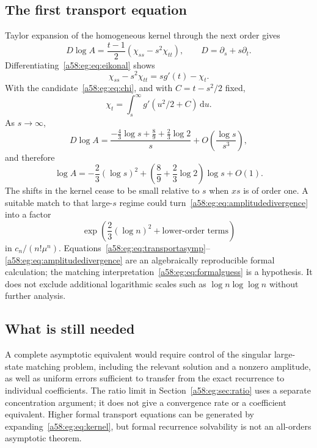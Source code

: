 \documentclass[11pt,letterpaper]{article}
\theoremstyle{remark}
\newcommand{\egdd}{\,\mathrm d}
\newcommand{\muval}{\mu}
\begin{document}
\subsection{The first transport equation}
Taylor expansion of the homogeneous kernel through the next order gives
\begin{equation}\label{a58:eg:eq:transport}
 D\log A=\frac{t-1}{2}(\chi_{ss}-s^2\chi_{tt}),
 \qquad D=\partial_s+s\partial_t.
\end{equation}
Differentiating~\eqref{a58:eg:eq:eikonal} shows
\[
 \chi_{ss}-s^2\chi_{tt}=s g'(t)-\chi_t.
\]
With the candidate~\eqref{a58:eg:eq:chi}, and with $C=t-s^2/2$ fixed,
\[
 \chi_t=\int_s^\infty g'(u^2/2+C)\egdd u.
\]
As $s\to\infty$,
\begin{equation}\label{a58:eg:eq:transportasymp}
 D\log A=
 \frac{-\frac43\log s+\frac89+\frac23\log2}{s}
 +O\left(\frac{\log s}{s^3}\right),
\end{equation}
and therefore
\begin{equation}\label{a58:eg:eq:amplitudedivergence}
 \log A=-\frac23(\log s)^2
 +\left(\frac89+\frac23\log2\right)\log s+O(1).
\end{equation}
The shifts in the kernel cease to be small relative to $s$ when $xs$ is of order one. A suitable match to that large-$s$ regime could turn~\eqref{a58:eg:eq:amplitudedivergence} into a factor
\begin{equation}\label{a58:eg:eq:formalguess}
 \exp\left(\frac23(\log n)^2+\text{lower-order terms}\right)
\end{equation}
in $c_n/(n!\muval^n)$. Equations~\eqref{a58:eg:eq:transportasymp}--\eqref{a58:eg:eq:amplitudedivergence} are an algebraically reproducible formal calculation; the matching interpretation~\eqref{a58:eg:eq:formalguess} is a hypothesis. It does not exclude additional logarithmic scales such as $\log n\log\log n$ without further analysis.

\subsection{What is still needed}
A complete asymptotic equivalent would require control of the singular large-state matching problem, including the relevant solution and a nonzero amplitude, as well as uniform errors sufficient to transfer from the exact recurrence to individual coefficients. The ratio limit in Section~\ref{a58:eg:sec:ratio} uses a separate concentration argument; it does not give a convergence rate or a coefficient equivalent. Higher formal transport equations can be generated by expanding~\eqref{a58:eg:eq:kernel}, but formal recurrence solvability is not an all-orders asymptotic theorem.
\end{document}
